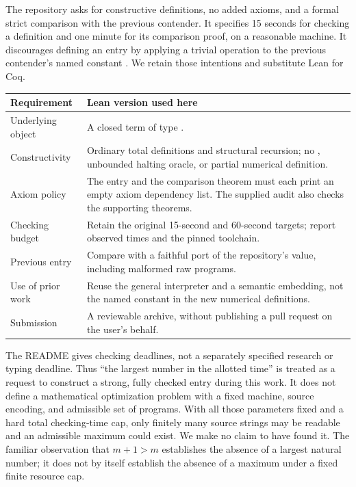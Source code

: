 \documentclass[11pt,a4paper]{article}
\theoremstyle{definition}
\newcommand{\code}[1]{\texttt{\detokenize{#1}}}
\begin{document}
The repository asks for constructive definitions, no added axioms, and a
formal strict comparison with the previous contender. It specifies
15 seconds for checking a definition and one minute for its comparison
proof, on a reasonable machine. It discourages defining an entry by applying
a trivial operation to the previous contender's named constant
\cite{contest}. We retain those intentions and substitute Lean for Coq.

\begin{center}
\begin{tabularx}{\linewidth}{@{}p{.24\linewidth}>{\raggedright\arraybackslash}X@{}}
\toprule
Requirement & Lean version used here\\
\midrule
Underlying object & A closed term of type \code{Nat}.\\
Constructivity & Ordinary total definitions and structural recursion; no
\code{noncomputable}, unbounded halting oracle, or partial numerical definition.\\
Axiom policy & The entry and the comparison theorem must each print an empty
axiom dependency list. The supplied audit also checks the supporting theorems.\\
Checking budget & Retain the original 15-second and 60-second targets;
report observed times and the pinned toolchain.\\
Previous entry & Compare with a faithful port of the repository's value,
including malformed raw programs.\\
Use of prior work & Reuse the general interpreter and a semantic embedding,
not the named \code{contender5} constant in the new numerical definitions.\\
Submission & A reviewable archive, without publishing a pull request on the
user's behalf.\\
\bottomrule
\end{tabularx}
\end{center}

The README gives checking deadlines, not a separately specified research or
typing deadline. Thus ``the largest number in the allotted time'' is treated
as a request to construct a strong, fully checked entry during this work.
It does not define a mathematical optimization problem with a fixed machine,
source encoding, and admissible set of programs. With all those parameters
fixed and a hard total checking-time cap, only finitely many source strings
may be readable and an admissible maximum could exist. We make no claim to
have found it. The familiar observation that \(m+1>m\) establishes the absence
of a largest natural number; it does not by itself establish the absence of
a maximum under a fixed finite resource cap.
\end{document}
